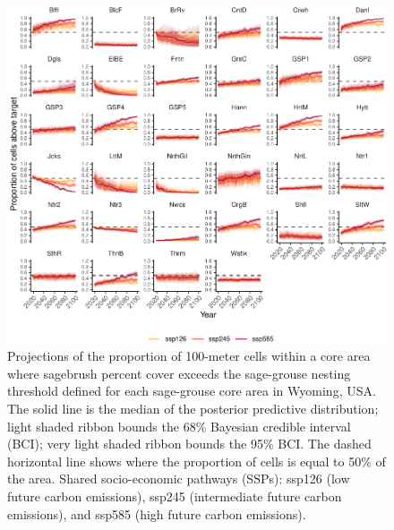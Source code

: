 \documentclass[
  12pt,
]{article}
\begin{document}
\begin{figure}
\centering
\includegraphics{sageCastManuscript_files/figure-latex/nesting-targs-1.pdf}
\caption{\label{fig:nesting-targs}Projections of the proportion of 100-meter cells within a core area where sagebrush percent cover exceeds the sage-grouse nesting threshold defined for each sage-grouse core area in Wyoming, USA. The solid line is the median of the posterior predictive distribution; light shaded ribbon bounds the 68\% Bayesian credible interval (BCI); very light shaded ribbon bounds the 95\% BCI. The dashed horizontal line shows where the proportion of cells is equal to 50\% of the area. Shared socio-economic pathways (SSPs): ssp126 (low future carbon emissions), ssp245 (intermediate future carbon emissions), and ssp585 (high future carbon emissions).}
\end{figure}
\end{document}
